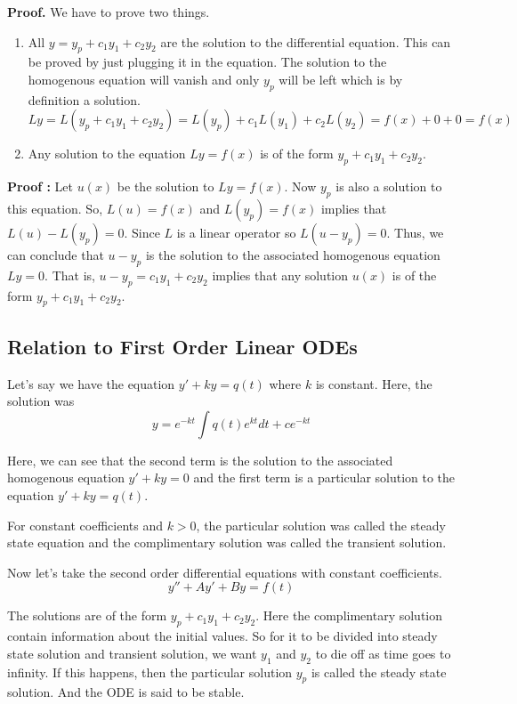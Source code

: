 {\bf Proof. }
We have to prove two things.

\begin{enumerate}
	\item All $y = y_p + c_1 y_1 + c_2 y_2$ are the solution to the differential equation.
	This can be proved by just plugging it in the equation. 
	The solution to the homogenous equation will vanish and only $y_p$ will be left which is by definition a solution.
	$$ Ly = L(y_p + c_1 y_1 + c_2 y_2) = L(y_p) + c_1 L(y_1) + c_2 L(y_2) = f(x) + 0 + 0 = f(x)$$ 
	\item Any solution to the equation $Ly = f(x)$ is of the form $y_p + c_1 y_1 + c_2 y_2$.
\end{enumerate}

{\bf Proof : } Let $u(x)$ be the solution to $Ly = f(x)$.
Now $y_p$ is also a solution to this equation. 
So, $L(u) = f(x)$ and $L(y_p) = f(x)$ implies that $L(u) - L(y_p) = 0$.
Since $L$ is a linear operator so $L(u - y_p) = 0$.
Thus, we can conclude that $u - y_p$ is the solution to the associated homogenous equation $Ly = 0$.
That is, $u - y_p = c_1 y_1 + c_2 y_2$ implies that any solution $u(x)$ is of the form $y_p + c_1 y_1 + c_2 y_2$.


\subsection{Relation to First Order Linear ODEs}

Let's say we have the equation $y' + ky = q(t)$ where $k$ is constant.
Here, the solution was
$$ y = e^{-kt} \int q(t) e^{kt} dt + ce^{-kt} $$

Here, we can see that the second term is the solution to the associated homogenous equation $y' + ky = 0$
and the first term is a particular solution to the equation $y' + ky = q(t)$.

For constant coefficients and $k > 0$, the particular solution was called the steady state equation 
and the complimentary solution was called the transient solution.

Now let's take the second order differential equations with constant coefficients.
$$ y'' + Ay' + By = f(t) $$

The solutions are of the form $y_p + c_1 y_1 + c_2 y_2$.
Here the complimentary solution contain information about the initial values.
So for it to be divided into steady state solution and transient solution, 
we want $y_1$ and $y_2$ to die off as time goes to infinity.
If this happens, then the particular solution $y_p$ is called the steady state solution.
And the ODE is said to be stable.

